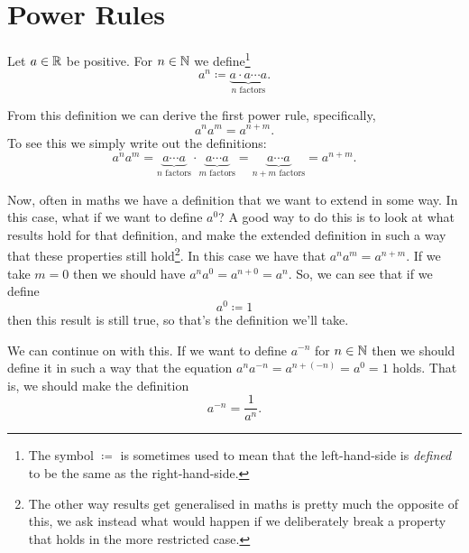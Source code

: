 \documentclass[fleqn]{LectureClass/LectureClass}
\begin{document}
    \section{Power Rules}
    Let \(a \in \mathbb{R}\) be positive.
    For \(n \in \mathbb{N}\) we define\footnote{The symbol \(\coloneq\) is sometimes used to mean that the left-hand-side is \emph{defined} to be the same as the right-hand-side.}
    \begin{equation}
        a^n \coloneq \underbrace{a \cdot a \dotsm a}_{n \text{ factors}}.
    \end{equation}
    
    From this definition we can derive the first power rule, specifically,
    \begin{equation}
        a^n a^m = a^{n + m}.
    \end{equation}
    To see this we simply write out the definitions:
    \begin{equation}
        a^n a^m = \underbrace{a \dotsm a}_{n \text{ factors}} \cdot \underbrace{a \dotsm a}_{m \text{ factors}} = \underbrace{a \dotsm a}_{n + m \text{ factors}} = a^{n + m}.
    \end{equation}
    
    Now, often in maths we have a definition that we want to extend in some way.
    In this case, what if we want to define \(a^0\)?
    A good way to do this is to look at what results hold for that definition, and make the extended definition in such a way that these properties still hold\footnote{The other way results get generalised in maths is pretty much the opposite of this, we ask instead what would happen if we deliberately break a property that holds in the more restricted case.}.
    In this case we have that \(a^n a^m = a^{n + m}\).
    If we take \(m = 0\) then we should have \(a^n a^0 = a^{n + 0} = a^n\).
    So, we can see that if we define
    \begin{equation}
        a^0 \coloneq 1
    \end{equation} 
    then this result is still true, so that's the definition we'll take.
    
    We can continue on with this.
    If we want to define \(a^{-n}\) for \(n \in \mathbb{N}\) then we should define it in such a way that the equation \(a^n a^{-n} = a^{n + (-n)} = a^0 = 1\) holds.
    That is, we should make the definition
    \begin{equation}
        a^{-n} = \frac{1}{a^n}.
    \end{equation}
    
\end{document}
